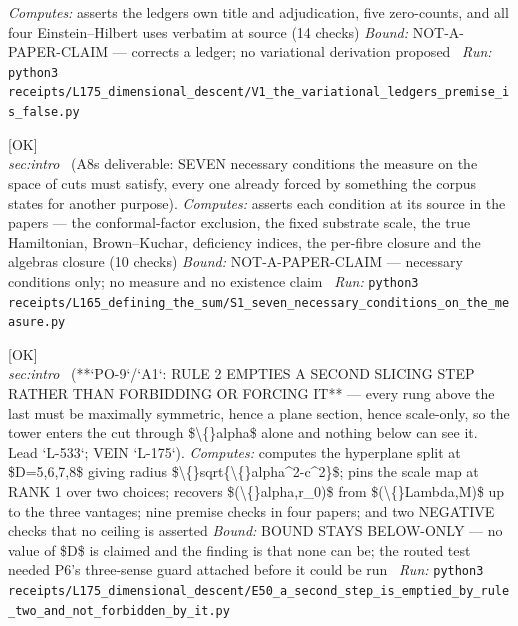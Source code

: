 \begin{description}
\emph{Computes:} asserts the ledgers own title and adjudication, five zero-counts, and all four Einstein--Hilbert uses verbatim at source (14 checks)
 \emph{Bound:} NOT-A-PAPER-CLAIM --- corrects a ledger; no variational derivation proposed
\ \emph{Run:} \texttt{python3 receipts/L175\_dimensional\_descent/V1\_the\_variational\_ledgers\_premise\_is\_false.py}
\item[\label{rcpt:S1_seven_necessary_conditions_on_the_measure}\textbf{}\quad\texttt{S1\_seven\_necessary\_conditions\_on\_the\_measure}]\hfill\textsf{[OK]}\\
\textit{sec:intro} \ (A8s deliverable: SEVEN necessary conditions the measure on the space of cuts must satisfy, every one already forced by something the corpus states for another purpose). 
\emph{Computes:} asserts each condition at its source in the papers --- the conformal-factor exclusion, the fixed substrate scale, the true Hamiltonian, Brown--Kuchar, deficiency indices, the per-fibre closure and the algebras closure (10 checks)
 \emph{Bound:} NOT-A-PAPER-CLAIM --- necessary conditions only; no measure and no existence claim
\ \emph{Run:} \texttt{python3 receipts/L165\_defining\_the\_sum/S1\_seven\_necessary\_conditions\_on\_the\_measure.py}
\item[\label{rcpt:E50_a_second_step_is_emptied_by_rule_two_and_not_forbidden_by_it}\textbf{}\quad\texttt{E50\_a\_second\_step\_is\_emptied\_by\_rule\_two\_and\_not\_forbidden\_by\_it}]\hfill\textsf{[OK]}\\
\textit{sec:intro} \ (**`PO-9`/`A1`: RULE 2 EMPTIES A SECOND SLICING STEP RATHER THAN FORBIDDING OR FORCING IT** --- every rung above the last must be maximally symmetric, hence a plane section, hence scale-only, so the tower enters the cut through \$\textbackslash\{\}alpha\$ alone and nothing below can see it. Lead `L-533`; VEIN `L-175`). 
\emph{Computes:} computes the hyperplane split at \$D=5,6,7,8\$ giving radius \$\textbackslash\{\}sqrt\{\textbackslash\{\}alpha\textasciicircum{}2-c\textasciicircum{}2\}\$; pins the scale map at RANK 1 over two choices; recovers \$(\textbackslash\{\}alpha,r\_0)\$ from \$(\textbackslash\{\}Lambda,M)\$ up to the three vantages; nine premise checks in four papers; and two NEGATIVE checks that no ceiling is asserted
 \emph{Bound:} BOUND STAYS BELOW-ONLY --- no value of \$D\$ is claimed and the finding is that none can be; the routed test needed P6's three-sense guard attached before it could be run
\ \emph{Run:} \texttt{python3 receipts/L175\_dimensional\_descent/E50\_a\_second\_step\_is\_emptied\_by\_rule\_two\_and\_not\_forbidden\_by\_it.py}

\end{description}
